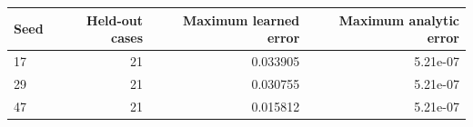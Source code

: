 \begin{tabular}{lrrr}\toprule Seed & Held-out cases & Maximum learned error & Maximum analytic error\\\midrule
17 & 21 & 0.033905 & 5.21e-07\\
29 & 21 & 0.030755 & 5.21e-07\\
47 & 21 & 0.015812 & 5.21e-07\\
\bottomrule\end{tabular}
